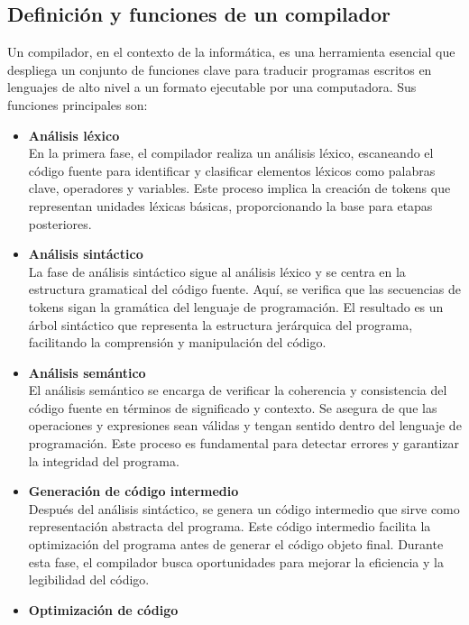 \subsection{Definición y funciones de un compilador}
Un compilador, en el contexto de la informática, es una herramienta esencial que despliega un conjunto de funciones clave para traducir programas escritos en lenguajes de alto nivel a un formato ejecutable por una computadora. Sus funciones principales son:

\begin{itemize}
  \item \textbf{Análisis léxico} \\
  En la primera fase, el compilador realiza un análisis léxico, escaneando el código fuente para identificar y clasificar elementos léxicos como palabras clave, operadores y variables. Este proceso implica la creación de tokens que representan unidades léxicas básicas, proporcionando la base para etapas posteriores. \parencite{cooper2022}
  \item \textbf{Análisis sintáctico} \\
  La fase de análisis sintáctico sigue al análisis léxico y se centra en la estructura gramatical del código fuente. Aquí, se verifica que las secuencias de tokens sigan la gramática del lenguaje de programación. El resultado es un árbol sintáctico que representa la estructura jerárquica del programa, facilitando la comprensión y manipulación del código. \parencite{Anderson2010}
  \item \textbf{Análisis semántico} \\
  El análisis semántico se encarga de verificar la coherencia y consistencia del código fuente en términos de significado y contexto. Se asegura de que las operaciones y expresiones sean válidas y tengan sentido dentro del lenguaje de programación. Este proceso es fundamental para detectar errores y garantizar la integridad del programa. \parencite{Anderson2010}
  \item \textbf{Generación de código intermedio} \\
  Después del análisis sintáctico, se genera un código intermedio que sirve como representación abstracta del programa. Este código intermedio facilita la optimización del programa antes de generar el código objeto final. Durante esta fase, el compilador busca oportunidades para mejorar la eficiencia y la legibilidad del código. \parencite{cooper2022}
  \item \textbf{Optimización de código} \\

\end{itemize}
